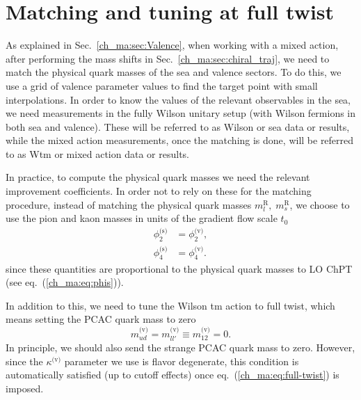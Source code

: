 

\section{Matching and tuning at full twist}
\label{ch_ma:sec:matching}

As explained in Sec.~\ref{ch_ma:sec:Valence}, when working with a mixed action, after performing the mass shifts in Sec.~\ref{ch_ma:sec:chiral_traj}, we need to match the physical quark masses of the sea and valence sectors. To do this, we use a grid of valence parameter values to find the target point with small interpolations. In order to know the values of the relevant observables in the sea, we need measurements in the fully Wilson unitary setup (with Wilson fermions in both sea and valence). These will be referred to as Wilson or sea data or results, while the mixed action measurements, once the matching is done, will be referred to as Wtm or mixed action data or results.

In practice, to compute the physical quark masses we need the relevant improvement coefficients. In order not to rely on these for the matching procedure, instead of matching the physical quark masses $m_l^{\textrm{R}},\;m_s^{\textrm{R}}$, we choose to use the pion and kaon masses in units of the gradient flow scale $t_0$
\begin{align}
\label{ch_ma:eq:matching}
\phi_2^{\textrm{(s)}}&=\phi_2^{\textrm{(v)}},\\
\phi_4^{\textrm{(s)}}&=\phi_4^{\textrm{(v)}}.
\end{align}
since these quantities are proportional to the physical quark masses to LO ChPT (see eq.~(\ref{ch_ma:eq:phis})).

In addition to this, we need to tune the Wilson tm action to full twist, which means setting the PCAC quark mass to zero
\begin{equation}
\label{ch_ma:eq:full-twist}
m_{ud}^{\textrm{(v)}}=m_{ll'}^{\textrm{(v)}}\equiv m_{12}^{\textrm{(v)}}=0.
\end{equation}
In principle, we should also send the strange PCAC quark mass to zero. However, since the $\kappa^{\textrm{(v)}}$ parameter we use is flavor degenerate, this condition is automatically satisfied (up to cutoff effects) once eq.~(\ref{ch_ma:eq:full-twist}) is imposed.

